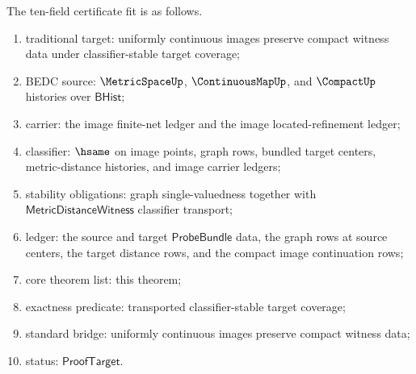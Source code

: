 \begin{theorem}
The ten-field certificate fit is as follows.
\begin{enumerate}
  \item traditional target: uniformly continuous images preserve compact witness
  data under classifier-stable target coverage;
  \item BEDC source: $\MetricSpaceUp$, $\ContinuousMapUp$, and $\CompactUp$
  histories over $\mathsf{BHist}$;
  \item carrier: the image finite-net ledger and the image located-refinement
  ledger;
  \item classifier: $\hsame$ on image points, graph rows, bundled target centers,
  metric-distance histories, and image carrier ledgers;
  \item stability obligations: graph single-valuedness together with
  $\mathsf{MetricDistanceWitness}$ classifier transport;
  \item ledger: the source and target $\mathsf{ProbeBundle}$ data, the graph rows
  at source centers, the target distance rows, and the compact image continuation
  rows;
  \item core theorem list: this theorem;
  \item exactness predicate: transported classifier-stable target coverage;
  \item standard bridge: uniformly continuous images preserve compact witness
  data;
  \item status: $\mathsf{ProofTarget}$.
\end{enumerate}
\end{theorem}

